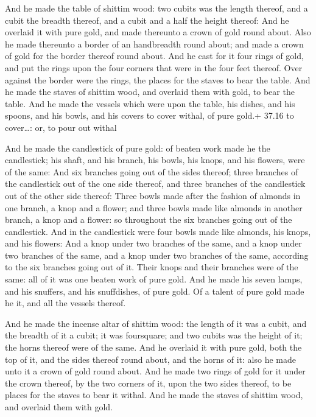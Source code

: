  And he made the table of shittim wood: two cubits was
the length thereof, and a cubit the breadth thereof, and a cubit and a
half the height thereof:  And he overlaid it with pure
gold, and made thereunto a crown of gold round about.  Also
he made thereunto a border of an handbreadth round about; and made a
crown of gold for the border thereof round about.  And he
cast for it four rings of gold, and put the rings upon the four corners
that were in the four feet thereof.  Over against the
border were the rings, the places for the staves to bear the table.
 And he made the staves of shittim wood, and overlaid them
with gold, to bear the table.  And he made the vessels
which were upon the table, his dishes, and his spoons, and his bowls,
and his covers to cover withal, of pure gold.+ 37.16 to cover\ldots: or,
to pour out withal

 And he made the candlestick of pure gold: of beaten work
made he the candlestick; his shaft, and his branch, his bowls, his
knops, and his flowers, were of the same:  And six branches
going out of the sides thereof; three branches of the candlestick out of
the one side thereof, and three branches of the candlestick out of the
other side thereof:  Three bowls made after the fashion of
almonds in one branch, a knop and a flower; and three bowls made like
almonds in another branch, a knop and a flower: so throughout the six
branches going out of the candlestick.  And in the
candlestick were four bowls made like almonds, his knops, and his
flowers:  And a knop under two branches of the same, and a
knop under two branches of the same, and a knop under two branches of
the same, according to the six branches going out of it. 
Their knops and their branches were of the same: all of it was one
beaten work of pure gold.  And he made his seven lamps, and
his snuffers, and his snuffdishes, of pure gold.  Of a
talent of pure gold made he it, and all the vessels thereof.

 And he made the incense altar of shittim wood: the
length of it was a cubit, and the breadth of it a cubit; it was
foursquare; and two cubits was the height of it; the horns thereof were
of the same.  And he overlaid it with pure gold, both the
top of it, and the sides thereof round about, and the horns of it: also
he made unto it a crown of gold round about.  And he made
two rings of gold for it under the crown thereof, by the two corners of
it, upon the two sides thereof, to be places for the staves to bear it
withal.  And he made the staves of shittim wood, and
overlaid them with gold.

